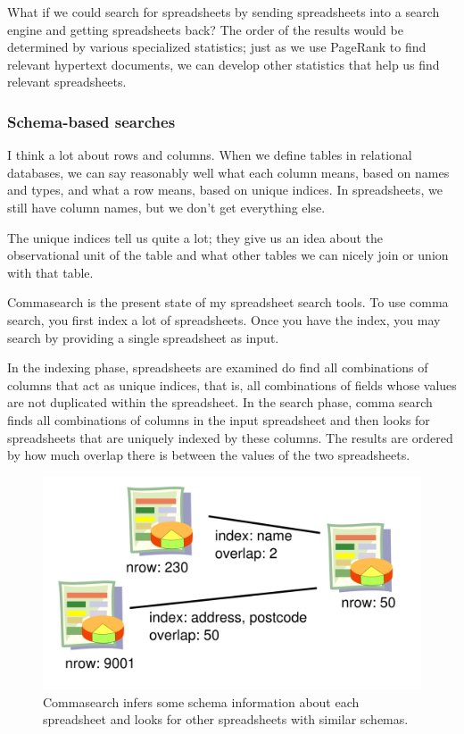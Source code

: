\documentclass{acm_proc_article-sp}
\begin{document}
What if we could search for spreadsheets
by sending spreadsheets into a search engine and getting spreadsheets back?
The order of the results would be determined by various specialized statistics;
just as we use PageRank to find relevant hypertext documents, we can develop
other statistics that help us find relevant spreadsheets.

\subsubsection{Schema-based searches}
I think a lot about rows and columns. When we define tables in relational
databases, we can say reasonably well what each column means, based on
names and types, and what a row means, based on unique indices.
In spreadsheets, we still have column names, but we don't get everything
else.

The unique indices tell us quite a lot; they give us an idea about the
observational unit of the table and what other tables we can nicely
join or union with that table.

Commasearch \cite{commasearch} is the present state of my spreadsheet search
tools. To use comma search, you first index a lot of spreadsheets. Once you
have the index, you may search by providing a single spreadsheet as input.

In the indexing phase, spreadsheets are examined do find all combinations of
columns that act as unique indices, that is, all combinations of fields whose
values are not duplicated within the spreadsheet. In the search phase,
comma search finds all combinations of columns in the input spreadsheet and
then looks for spreadsheets that are uniquely indexed by these columns.
The results are ordered by how much overlap there is between the values of
the two spreadsheets.

\begin{figure}
\includegraphics[width=\columnwidth]{../pagerank-for-spreadsheets/network.png}
\caption{Commasearch infers some schema information about each spreadsheet and looks for other spreadsheets with similar schemas.}
\centering
\end{figure}
\end{document}
